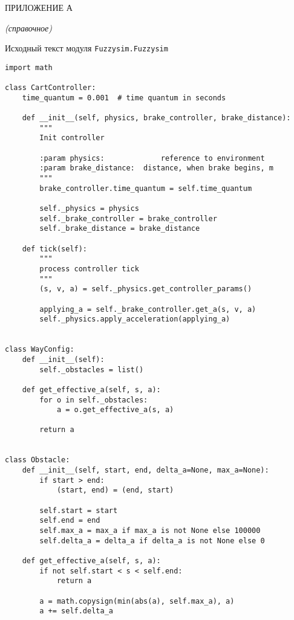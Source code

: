 \lstset{style=pythoninlinestyle}

%

 \begin{center}
	ПРИЛОЖЕНИЕ А
	
	\textit{(справочное)}
\end{center}


\begin{center}
	Исходный текст модуля \lstinline!Fuzzysim.Fuzzysim!
\end{center}



\begin{lstlisting}[style=pythonstyle,caption={ }, label=lst:func:1]
import math

class CartController:
	time_quantum = 0.001  # time quantum in seconds

	def __init__(self, physics, brake_controller, brake_distance):
		"""
		Init controller

		:param physics:				reference to environment
		:param brake_distance: 	distance, when brake begins, m
		"""
		brake_controller.time_quantum = self.time_quantum

		self._physics = physics
		self._brake_controller = brake_controller
		self._brake_distance = brake_distance

	def tick(self):
		"""
		process controller tick
		"""
		(s, v, a) = self._physics.get_controller_params()

		applying_a = self._brake_controller.get_a(s, v, a)
		self._physics.apply_acceleration(applying_a)


class WayConfig:
	def __init__(self):
		self._obstacles = list()

	def get_effective_a(self, s, a):
		for o in self._obstacles:
			a = o.get_effective_a(s, a)

		return a


class Obstacle:
	def __init__(self, start, end, delta_a=None, max_a=None):
		if start > end:
			(start, end) = (end, start)

		self.start = start
		self.end = end
		self.max_a = max_a if max_a is not None else 100000
		self.delta_a = delta_a if delta_a is not None else 0

	def get_effective_a(self, s, a):
		if not self.start < s < self.end:
			return a

		a = math.copysign(min(abs(a), self.max_a), a)
		a += self.delta_a


\end{lstlisting}
